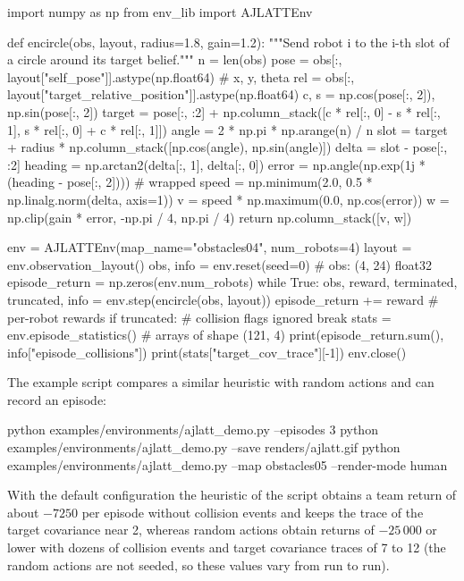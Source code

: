 \begin{pycode}
import numpy as np
from env_lib import AJLATTEnv


def encircle(obs, layout, radius=1.8, gain=1.2):
    """Send robot i to the i-th slot of a circle around its target belief."""
    n = len(obs)
    pose = obs[:, layout["self_pose"]].astype(np.float64)   # x, y, theta
    rel = obs[:, layout["target_relative_position"]].astype(np.float64)
    c, s = np.cos(pose[:, 2]), np.sin(pose[:, 2])
    target = pose[:, :2] + np.column_stack([c * rel[:, 0] - s * rel[:, 1],
                                            s * rel[:, 0] + c * rel[:, 1]])
    angle = 2 * np.pi * np.arange(n) / n
    slot = target + radius * np.column_stack([np.cos(angle), np.sin(angle)])
    delta = slot - pose[:, :2]
    heading = np.arctan2(delta[:, 1], delta[:, 0])
    error = np.angle(np.exp(1j * (heading - pose[:, 2])))  # wrapped
    speed = np.minimum(2.0, 0.5 * np.linalg.norm(delta, axis=1))
    v = speed * np.maximum(0.0, np.cos(error))
    w = np.clip(gain * error, -np.pi / 4, np.pi / 4)
    return np.column_stack([v, w])


env = AJLATTEnv(map_name="obstacles04", num_robots=4)
layout = env.observation_layout()
obs, info = env.reset(seed=0)                  # obs: (4, 24) float32
episode_return = np.zeros(env.num_robots)
while True:
    obs, reward, terminated, truncated, info = env.step(encircle(obs, layout))
    episode_return += reward                   # per-robot rewards
    if truncated:                              # collision flags ignored
        break
stats = env.episode_statistics()               # arrays of shape (121, 4)
print(episode_return.sum(), info["episode_collisions"])
print(stats["target_cov_trace"][-1])
env.close()
\end{pycode}

The example script compares a similar heuristic with random actions and can
record an episode:

\begin{shellcode}
python examples/environments/ajlatt_demo.py --episodes 3
python examples/environments/ajlatt_demo.py --save renders/ajlatt.gif
python examples/environments/ajlatt_demo.py --map obstacles05 --render-mode human
\end{shellcode}

With the default configuration the heuristic of the script obtains a team
return of about $-7250$ per episode without collision events and keeps the
trace of the target covariance near 2, whereas random actions obtain returns of
$-25\,000$ or lower with dozens of collision events and target covariance traces
of 7 to 12 (the random actions are not seeded, so these values vary from run to
run).

